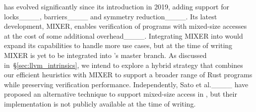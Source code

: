 \genmc{} has evolved significantly since its introduction in 2019, adding
support for locks____, 
barriers____ and symmetry 
reduction____.
Its latest development, MIXER, enables verification of programs with
mixed-size accesses at the cost of some additional
overhead____. Integrating MIXER into
\rustmc would expand its capabilities to handle more use cases, but 
at the time of writing MIXER is yet to be integrated into \genmc's master
branch. As discussed in~\S\ref{sec:llvm_intrinsics}, we intend to
explore a hybrid strategy that combines our efficient heuristics with MIXER to
support a broader range of Rust programs while preserving verification
performance.
Independently, Sato et al.____ have proposed an
alternative technique to support mixed-size access in \genmc, but
their implementation is not publicly available at the time of writing.